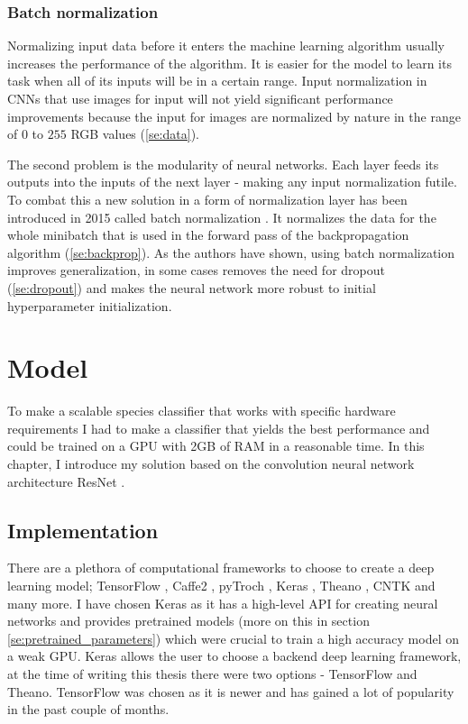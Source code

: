 \documentclass[times, utf8, diplomski]{fer}
\begin{document}
\subsection{Batch normalization}
\label{se:batch_norm}

Normalizing input data before it enters the machine learning algorithm usually increases the performance of the algorithm. It is easier for the model to learn its task when all of its inputs will be in a certain range. Input normalization in CNNs that use images for input will not yield significant performance improvements because the input for images are normalized by nature in the range of $0$ to $255$ RGB values (\ref{se:data}). 

The second problem is the modularity of neural networks. Each layer feeds its outputs into the inputs of the next layer - making any input normalization futile. To combat this a new solution in a form of normalization layer has been introduced in 2015 called batch normalization \citep{ioffe_batch_2015}. It normalizes the data for the whole minibatch that is used in the forward pass of the backpropagation algorithm (\ref{se:backprop}). As the authors have shown, using batch normalization improves generalization, in some cases removes the need for dropout (\ref{se:dropout}) and makes the neural network more robust to initial hyperparameter initialization.

\chapter{Model}
\label{se:model}
To make a scalable species classifier that works with specific hardware requirements I had to make a classifier that yields the best performance and could be trained on a GPU with 2GB of RAM in a reasonable time. In this chapter, I introduce my solution based on the convolution neural network architecture ResNet \citep{he_deep_2016}.


\section{Implementation}

There are a plethora of computational frameworks to choose to create a deep learning model; TensorFlow \citep{tensorflow}, Caffe2 \citep{caffe}, pyTroch \citep{pytorch}, Keras \citep{keras}, Theano \citep{theano}, CNTK \citep{cntk} and many more. I have chosen Keras as it has a high-level API for creating neural networks and provides pretrained models (more on this in section \ref{se:pretrained_parameters}) which were crucial to train a high accuracy model on a weak GPU. Keras allows the user to choose a backend deep learning framework, at the time of writing this thesis there were two options - TensorFlow and Theano. TensorFlow was chosen as it is newer and has gained a lot of popularity in the past couple of months.
\end{document}
